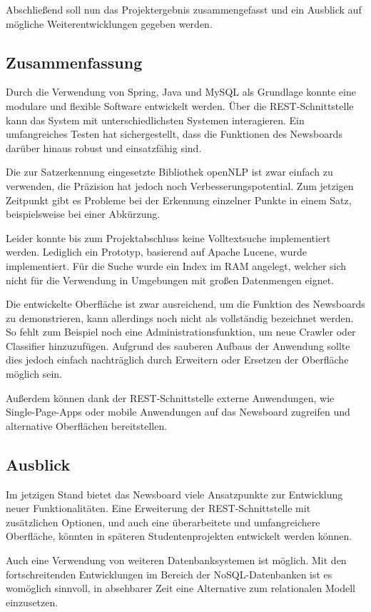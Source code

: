 Abschließend soll nun das Projektergebnis zusammengefasst und ein Ausblick auf mögliche
Weiterentwicklungen gegeben werden.

\subsection{Zusammenfassung}
Durch die Verwendung von Spring, Java und MySQL als Grundlage konnte eine modulare
und flexible Software entwickelt werden. Über die REST-Schnittstelle kann das System
mit unterschiedlichsten Systemen interagieren. Ein umfangreiches Testen hat sichergestellt,
dass die Funktionen des Newsboards darüber hinaus robust und einsatzfähig sind.

Die zur Satzerkennung eingesetzte Bibliothek openNLP ist zwar einfach zu
verwenden, die Präzision hat jedoch noch Verbesserungspotential. Zum jetzigen Zeitpunkt gibt 
es Probleme bei der Erkennung einzelner Punkte in einem Satz, beispielsweise bei einer
Abkürzung.

Leider konnte bis zum Projektabschluss keine Volltextsuche implementiert werden. Lediglich
ein Prototyp, basierend auf Apache Lucene, wurde implementiert. Für die Suche wurde ein 
Index im RAM angelegt, welcher sich nicht für die Verwendung in Umgebungen mit großen
Datenmengen eignet.

Die entwickelte Oberfläche ist zwar ausreichend, um die Funktion des Newsboards
zu demonstrieren, kann allerdings noch nicht als vollständig bezeichnet werden.
So fehlt zum Beispiel noch eine Administrationsfunktion, um neue Crawler oder Classifier
hinzuzufügen. Aufgrund des sauberen Aufbaus der Anwendung sollte dies jedoch einfach
nachträglich durch Erweitern oder Ersetzen der Oberfläche möglich sein.

Außerdem können dank der REST-Schnittstelle externe Anwendungen, wie Single-Page-Apps
oder mobile Anwendungen auf das Newsboard zugreifen und alternative Oberflächen
bereitstellen.

\subsection{Ausblick} 
Im jetzigen Stand bietet das Newsboard viele Ansatzpunkte zur Entwicklung neuer 
Funktionalitäten. Eine Erweiterung der REST-Schnittstelle mit zusätzlichen Optionen,
und auch eine überarbeitete und umfangreichere Oberfläche, könnten in späteren 
Studentenprojekten entwickelt werden können.

Auch eine Verwendung von weiteren Datenbanksystemen ist möglich. Mit den fortschreitenden
Entwicklungen im Bereich der NoSQL-Datenbanken ist es womöglich sinnvoll, in
absehbarer Zeit eine Alternative zum relationalen Modell einzusetzen.

